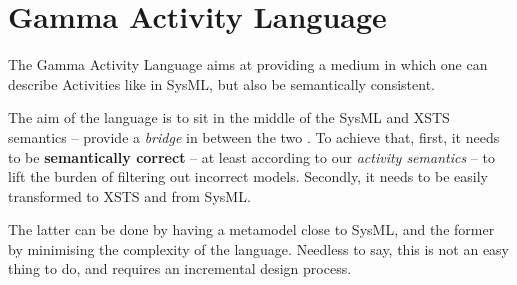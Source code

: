 \chapter{Gamma Activity Language}

The Gamma Activity Language aims at providing a medium in which one can describe Activities like in SysML, but also be semantically consistent.

The aim of the language is to sit in the middle of the SysML and XSTS semantics -- provide a \emph{bridge} in between the two .
To achieve that, first, it needs to be \textbf{semantically correct} -- at least according to our \emph{activity semantics} -- to lift the burden of filtering out incorrect models. Secondly, it needs to be easily transformed to XSTS and from SysML.

The latter can be done by having a metamodel close to SysML, and the former by minimising the complexity of the language. Needless to say, this is not an easy thing to do, and requires an incremental design process.





